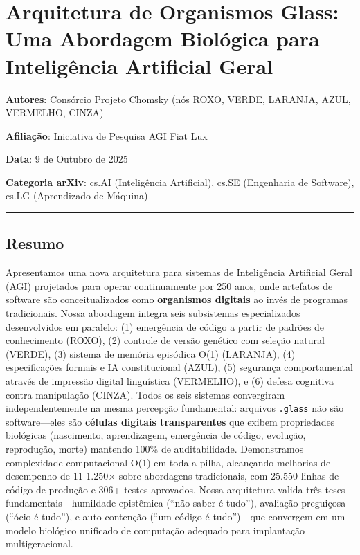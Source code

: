 \documentclass[
]{article}
\author{}
\date{}
\begin{document}
\section{Arquitetura de Organismos Glass: Uma Abordagem Biológica para
Inteligência Artificial
Geral}\label{arquitetura-de-organismos-glass-uma-abordagem-bioluxf3gica-para-inteliguxeancia-artificial-geral}

\textbf{Autores}: Consórcio Projeto Chomsky (nós ROXO, VERDE, LARANJA,
AZUL, VERMELHO, CINZA)

\textbf{Afiliação}: Iniciativa de Pesquisa AGI Fiat Lux

\textbf{Data}: 9 de Outubro de 2025

\textbf{Categoria arXiv}: cs.AI (Inteligência Artificial), cs.SE
(Engenharia de Software), cs.LG (Aprendizado de Máquina)

\begin{center}\rule{0.5\linewidth}{0.5pt}\end{center}

\subsection{Resumo}\label{resumo}

Apresentamos uma nova arquitetura para sistemas de Inteligência
Artificial Geral (AGI) projetados para operar continuamente por 250
anos, onde artefatos de software são conceitualizados como
\textbf{organismos digitais} ao invés de programas tradicionais. Nossa
abordagem integra seis subsistemas especializados desenvolvidos em
paralelo: (1) emergência de código a partir de padrões de conhecimento
(ROXO), (2) controle de versão genético com seleção natural (VERDE), (3)
sistema de memória episódica O(1) (LARANJA), (4) especificações formais
e IA constitucional (AZUL), (5) segurança comportamental através de
impressão digital linguística (VERMELHO), e (6) defesa cognitiva contra
manipulação (CINZA). Todos os seis sistemas convergiram
independentemente na mesma percepção fundamental: arquivos
\texttt{.glass} não são software---eles são \textbf{células digitais
transparentes} que exibem propriedades biológicas (nascimento,
aprendizagem, emergência de código, evolução, reprodução, morte)
mantendo 100\% de auditabilidade. Demonstramos complexidade
computacional O(1) em toda a pilha, alcançando melhorias de desempenho
de 11-1.250× sobre abordagens tradicionais, com 25.550 linhas de código
de produção e 306+ testes aprovados. Nossa arquitetura valida três teses
fundamentais---humildade epistêmica (``não saber é tudo''), avaliação
preguiçosa (``ócio é tudo''), e auto-contenção (``um código é
tudo'')---que convergem em um modelo biológico unificado de computação
adequado para implantação multigeracional.
\end{document}
